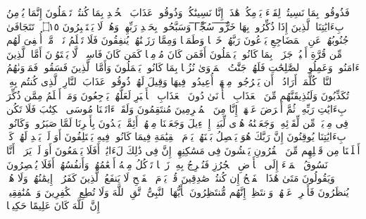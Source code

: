 \stopbuffer
\startbuffer[\q:32:14]
فَذُوقُوا۟ بِمَا نَسِیتُمۡ لِقَاۤءَ یَوۡمِكُمۡ هَٰذَاۤ إِنَّا نَسِینَٰكُمۡۖ وَذُوقُوا۟ عَذَابَ ٱلۡخُلۡدِ بِمَا كُنتُمۡ تَعۡمَلُونَ%
\stopbuffer
\startbuffer[\q:32:15]
إِنَّمَا یُؤۡمِنُ بِءَایَٰتِنَا ٱلَّذِینَ إِذَا ذُكِّرُوا۟ بِهَا خَ̅رُّ̅و̅ا۟̅ ̅سُ̅جَّ̅دࣰ̅ا̅ وَسَبَّحُوا۟ بِحَمۡدِ رَبِّهِمۡ وَهُمۡ لَا یَسۡتَكۡبِرُونَ ۝١٥ ۩%
\stopbuffer
\startbuffer[\q:32:16]
تَتَجَافَىٰ جُنُوبُهُمۡ عَنِ ٱلۡمَضَاجِعِ یَدۡعُونَ رَبَّهُمۡ خَوۡفࣰا وَطَمَعࣰا وَمِمَّا رَزَقۡنَٰهُمۡ یُنفِقُونَ%
\stopbuffer
\startbuffer[\q:32:17]
فَلَا تَعۡلَمُ نَفۡسࣱ مَّاۤ أُخۡفِیَ لَهُم مِّن قُرَّةِ أَعۡیُنࣲ جَزَاۤءَۢ بِمَا كَانُوا۟ یَعۡمَلُونَ%
\stopbuffer
\startbuffer[\q:32:18]
أَفَمَن كَانَ مُؤۡمِنࣰا كَمَن كَانَ فَاسِقࣰاۚ لَّا یَسۡتَوُۥنَ%
\stopbuffer
\startbuffer[\q:32:19]
أَمَّا ٱلَّذِینَ ءَامَنُوا۟ وَعَمِلُوا۟ ٱلصَّٰلِحَٰتِ فَلَهُمۡ جَنَّٰتُ ٱلۡمَأۡوَىٰ نُزُلَۢا بِمَا كَانُوا۟ یَعۡمَلُونَ%
\stopbuffer
\startbuffer[\q:32:20]
وَأَمَّا ٱلَّذِینَ فَسَقُوا۟ فَمَأۡوَىٰهُمُ ٱلنَّارُۖ كُلَّمَاۤ أَرَادُوۤا۟ أَن یَخۡرُجُوا۟ مِنۡهَاۤ أُعِیدُوا۟ فِیهَا وَقِیلَ لَهُمۡ ذُوقُوا۟ عَذَابَ ٱلنَّارِ ٱلَّذِی كُنتُم بِهِۦ تُكَذِّبُونَ%
\stopbuffer
\startbuffer[\q:32:21]
وَلَنُذِیقَنَّهُم مِّنَ ٱلۡعَذَابِ ٱلۡأَدۡنَىٰ دُونَ ٱلۡعَذَابِ ٱلۡأَكۡبَرِ لَعَلَّهُمۡ یَرۡجِعُونَ%
\stopbuffer
\startbuffer[\q:32:22]
وَمَنۡ أَظۡلَمُ مِمَّن ذُكِّرَ بِءَایَٰتِ رَبِّهِۦ ثُمَّ أَعۡرَضَ عَنۡهَاۤۚ إِنَّا مِنَ ٱلۡمُجۡرِمِینَ مُنتَقِمُونَ%
\stopbuffer
\startbuffer[\q:32:23]
وَلَقَدۡ ءَاتَیۡنَا مُوسَى ٱلۡكِتَٰبَ فَلَا تَكُن فِی مِرۡیَةࣲ مِّن لِّقَاۤئِهِۦۖ وَجَعَلۡنَٰهُ هُدࣰى لِّبَنِیۤ إِسۡرَٰۤءِیلَ%
\stopbuffer
\startbuffer[\q:32:24]
وَجَعَلۡنَا مِنۡهُمۡ أَئِمَّةࣰ یَهۡدُونَ بِأَمۡرِنَا لَمَّا صَبَرُوا۟ۖ وَكَانُوا۟ بِءَایَٰتِنَا یُوقِنُونَ%
\stopbuffer
\startbuffer[\q:32:25]
إِنَّ رَبَّكَ هُوَ یَفۡصِلُ بَیۡنَهُمۡ یَوۡمَ ٱلۡقِیَٰمَةِ فِیمَا كَانُوا۟ فِیهِ یَخۡتَلِفُونَ%
\stopbuffer
\startbuffer[\q:32:26]
أَوَ لَمۡ یَهۡدِ لَهُمۡ كَمۡ أَهۡلَكۡنَا مِن قَبۡلِهِم مِّنَ ٱلۡقُرُونِ یَمۡشُونَ فِی مَسَٰكِنِهِمۡۚ إِنَّ فِی ذَٰلِكَ لَءَایَٰتٍۚ أَفَلَا یَسۡمَعُونَ%
\stopbuffer
\startbuffer[\q:32:27]
أَوَ لَمۡ یَرَوۡا۟ أَنَّا نَسُوقُ ٱلۡمَاۤءَ إِلَى ٱلۡأَرۡضِ ٱلۡجُرُزِ فَنُخۡرِجُ بِهِۦ زَرۡعࣰا تَأۡكُلُ مِنۡهُ أَنۡعَٰمُهُمۡ وَأَنفُسُهُمۡۚ أَفَلَا یُبۡصِرُونَ%
\stopbuffer
\startbuffer[\q:32:28]
وَیَقُولُونَ مَتَىٰ هَٰذَا ٱلۡفَتۡحُ إِن كُنتُمۡ صَٰدِقِینَ%
\stopbuffer
\startbuffer[\q:32:29]
قُلۡ یَوۡمَ ٱلۡفَتۡحِ لَا یَنفَعُ ٱلَّذِینَ كَفَرُوۤا۟ إِیمَٰنُهُمۡ وَلَا هُمۡ یُنظَرُونَ%
\stopbuffer
\startbuffer[\q:32:30]
فَأَعۡرِضۡ عَنۡهُمۡ وَٱنتَظِرۡ إِنَّهُم مُّنتَظِرُونَ%
\stopbuffer
\startbuffer[\q:33:1]
یَٰۤأَیُّهَا ٱلنَّبِیُّ ٱتَّقِ ٱللَّهَ وَلَا تُطِعِ ٱلۡكَٰفِرِینَ وَٱلۡمُنَٰفِقِینَۚ إِنَّ ٱللَّهَ كَانَ عَلِیمًا حَكِیمࣰا%
